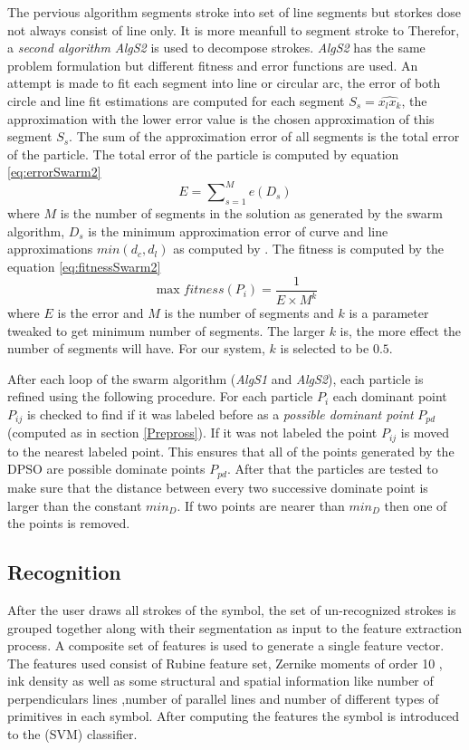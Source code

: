 \documentclass{article}
\begin{document}
The pervious algorithm segments stroke into set of line segments but storkes dose not always consist of line only. It is more meanfull to segment stroke to  Therefor, a \textit{second algorithm \textsl{AlgS2}} is used to decompose strokes. \textit{\textsl{AlgS2}} has the same problem formulation but different fitness and error functions are used. An attempt is made to fit each segment into line or circular arc, the error of both circle and line fit estimations are computed for each segment $S_s=\widehat{x_lx_k}$, the approximation with the lower error value is the chosen approximation of this segment $S_s$\cite{CruveDivisionSwarm}. The sum of the approximation error of all segments is the total error of the particle.  The total error of the particle is computed by equation \ref{eq:errorSwarm2}
 \begin{equation}
E=\sum\nolimits_{s = 1}^M e(D_s) 
\label{eq:errorSwarm2}
\end{equation}where $M$ is the number of segments in the solution as generated by the swarm algorithm, $D_s$ is the minimum approximation error of curve and line approximations $min(d_c,d_l)$ as computed by \cite{CruveDivisionSwarm}.  The fitness is computed by the equation \ref{eq:fitnessSwarm2} \begin{equation}
\max fitness(P_i ) = \frac{1}{{E \times M^k }}
\label{eq:fitnessSwarm2}
\end{equation} where $E$ is the error and $M$ is the number of segments and $k$ is a parameter tweaked to get minimum number of segments. The larger $k$ is, the more effect the number of segments will have. For our system, $k$ is selected to be $0.5$\cite{CruveDivisionSwarm}.

After each loop of the swarm algorithm (\textsl{AlgS1} and \textsl{AlgS2}), each particle is refined using the following procedure. For each particle $P_i$ each dominant point $P_{ij}$ is checked to find if it was labeled before as a \textit{possible dominant point} $P_{pd}$ (computed as in section \ref{Prepross}). If it was not labeled the point $P_{ij}$ is moved to the nearest labeled point. This ensures that all of the points generated by the DPSO are possible dominate points $P_{pd}$. After that the particles are tested to make sure that the distance between every two successive dominate point is larger than the constant $min_D$. If two points are nearer than $min_D$ then one of the points is removed. 
\subsection{Recognition}
\label{sec:Recognition}
After the user draws all strokes of the symbol, the set of un-recognized strokes is grouped together along with their segmentation as input to the feature extraction process. A composite set of features is used to generate a single feature vector. The features used consist of Rubine feature set,  Zernike moments of order 10 \cite{HeloiseBeautification}, ink density as well as some structural and spatial information like number of perpendiculars lines ,number of parallel lines and number of different types of primitives in each symbol. After computing the features the symbol is introduced to the (SVM) classifier. 
\end{document}
